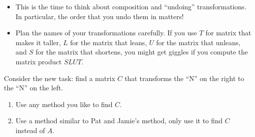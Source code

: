 \documentclass{problemset}
\begin{document}
\begin{iola}
	\begin{annotation}
		\begin{notes}
			\begin{itemize}
				\item This is the time to think about composition and ``undoing'' 
					transformations. In particular, the order that you undo
					them in matters!
				\item Plan the names of your transformations carefully. If you use
					$T$ for matrix that makes it taller, $L$ for the matrix that leans,
					$U$ for the matrix that unleans, and $S$ for the matrix that shortens,
					you might get giggles if you compute the matrix product $SLUT$.
			\end{itemize}
		\end{notes}
	\end{annotation}
Consider the new task: find a matrix $C$ that transforms the ``N'' on the right to
the ``N'' on the left.
\begin{enumerate}
	\item Use any method you like to find $C$.
	\item Use a method similar to Pat and Jamie's method, only use it to find $C$ instead
		of $A$.
\end{enumerate}
\end{iola}
\end{document}
